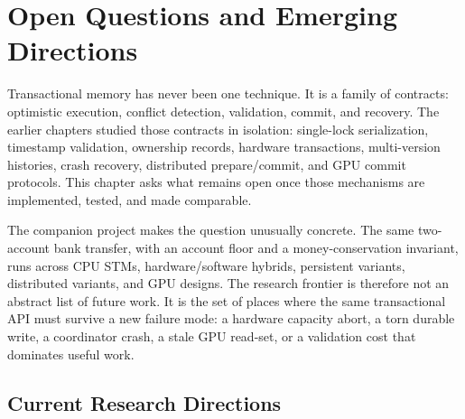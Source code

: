 \chapter{Open Questions and Emerging Directions}


Transactional memory has never been one technique. It is a family of contracts: optimistic execution, conflict detection, validation, commit, and recovery. The earlier chapters studied those contracts in isolation: single-lock serialization, timestamp validation, ownership records, hardware transactions, multi-version histories, crash recovery, distributed prepare/commit, and GPU commit protocols. This chapter asks what remains open once those mechanisms are implemented, tested, and made comparable.

The companion project makes the question unusually concrete. The same two-account bank transfer, with an account floor and a money-conservation invariant, runs across CPU STMs, hardware/software hybrids, persistent variants, distributed variants, and GPU designs. The research frontier is therefore not an abstract list of future work. It is the set of places where the same transactional API must survive a new failure mode: a hardware capacity abort, a torn durable write, a coordinator crash, a stale GPU read-set, or a validation cost that dominates useful work.

\section{Current Research Directions}

